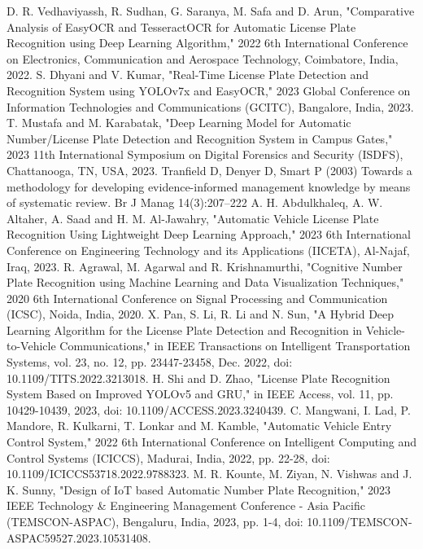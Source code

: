 \documentclass[conference]{IEEEtran}
\begin{document}
\begin{thebibliography}{00}
 D. R. Vedhaviyassh, R. Sudhan, G. Saranya, M. Safa and D. Arun, "Comparative Analysis of EasyOCR and TesseractOCR for Automatic License Plate Recognition using Deep Learning Algorithm," 2022 6th International Conference on Electronics, Communication and Aerospace Technology, Coimbatore, India, 2022.
 S. Dhyani and V. Kumar, "Real-Time License Plate Detection and Recognition System using YOLOv7x and EasyOCR," 2023 Global Conference on Information Technologies and Communications (GCITC), Bangalore, India, 2023.
 T. Mustafa and M. Karabatak, "Deep Learning Model for Automatic Number/License Plate Detection and Recognition System in Campus Gates," 2023 11th International Symposium on Digital Forensics and Security (ISDFS), Chattanooga, TN, USA, 2023.
 Tranfield D, Denyer D, Smart P (2003) Towards a methodology for developing evidence-informed management knowledge by means of systematic review. Br J Manag 14(3):207–222
 A. H. Abdulkhaleq, A. W. Altaher, A. Saad and H. M. Al-Jawahry, "Automatic Vehicle License Plate Recognition Using Lightweight Deep Learning Approach," 2023 6th International Conference on Engineering Technology and its Applications (IICETA), Al-Najaf, Iraq, 2023.
 R. Agrawal, M. Agarwal and R. Krishnamurthi, "Cognitive Number Plate Recognition using Machine Learning and Data Visualization Techniques," 2020 6th International Conference on Signal Processing and Communication (ICSC), Noida, India, 2020.
 X. Pan, S. Li, R. Li and N. Sun, "A Hybrid Deep Learning Algorithm for the License Plate Detection and Recognition in Vehicle-to-Vehicle Communications," in IEEE Transactions on Intelligent Transportation Systems, vol. 23, no. 12, pp. 23447-23458, Dec. 2022, doi: 10.1109/TITS.2022.3213018.
 H. Shi and D. Zhao, "License Plate Recognition System Based on Improved YOLOv5 and GRU," in IEEE Access, vol. 11, pp. 10429-10439, 2023, doi: 10.1109/ACCESS.2023.3240439.
 C. Mangwani, I. Lad, P. Mandore, R. Kulkarni, T. Lonkar and M. Kamble, "Automatic Vehicle Entry Control System," 2022 6th International Conference on Intelligent Computing and Control Systems (ICICCS), Madurai, India, 2022, pp. 22-28, doi: 10.1109/ICICCS53718.2022.9788323.
 M. R. Kounte, M. Ziyan, N. Vishwas and J. K. Sunny, "Design of IoT based Automatic Number Plate Recognition," 2023 IEEE Technology \& Engineering Management Conference - Asia Pacific (TEMSCON-ASPAC), Bengaluru, India, 2023, pp. 1-4, doi: 10.1109/TEMSCON-ASPAC59527.2023.10531408.

\end{thebibliography}
\end{document}
